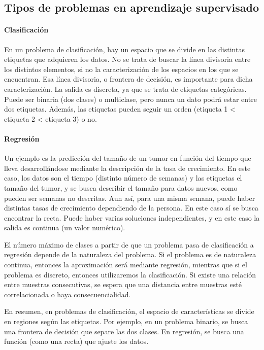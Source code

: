 \subsection{Tipos de problemas en aprendizaje supervisado}
\paragraph{Clasificación}
En un problema de clasificación, hay un espacio que se divide en las distintas etiquetas que adquieren los datos. No se trata de buscar la línea divisoria entre los distintos elementos, si no la caracterización de los espacios en los que se encuentran. Esa línea divisoria, o frontera de decisión, es importante para dicha caracterización. La salida es discreta, ya que se trata de etiquetas categóricas. Puede ser binaria (dos clases) o multiclase, pero nunca un dato podrá estar entre dos etiquetas. Además, las etiquetas pueden seguir un orden (etiqueta 1 < etiqueta 2 < etiqueta 3) o no.

\paragraph{Regresión}
Un ejemplo es la predicción del tamaño de un tumor en función del tiempo que lleva desarrollándose mediante la descripción de la tasa de crecimiento. En este caso, los datos son el tiempo (distinto número de semanas) y las etiquetas el tamaño del tumor, y se busca describir el tamaño para datos nuevos, como pueden ser semanas no descritas. Aun así, para una misma semana, puede haber distintas tasas de crecimiento dependiendo de la persona. En este caso sí se busca encontrar la recta. Puede haber varias soluciones independientes, y en este caso la salida es continua (un valor numérico).

El número máximo de clases a partir de que un problema pasa de clasificación a regresión depende de la naturaleza del problema. Si el problema es de naturaleza continua, entonces la aproximación será mediante regresión, mientras que si el problema es discreto, entonces utilizaremos la clasificación. Si existe una relación entre muestras consecutivas, se espera que una distancia entre muestras esté correlacionada o haya consecuencialidad. 

En resumen, en problemas de clasificación, el espacio de características se divide en regiones según las etiquetas. Por ejemplo, en un problema binario, se busca una frontera de decisión que separe las dos clases. En regresión, se busca una función (como una recta) que ajuste los datos.

